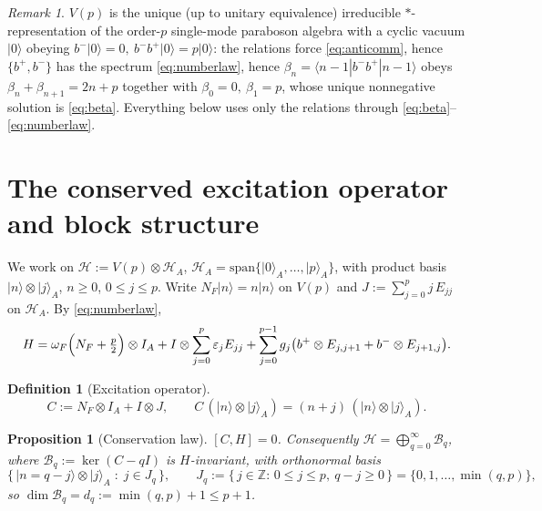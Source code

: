 \documentclass[12pt]{article}
\newtheorem{proposition}{Proposition}
\theoremstyle{definition}
\newtheorem{definition}{Definition}
\theoremstyle{remark}
\newtheorem{remark}{Remark}
\newcommand{\ket}[1]{\lvert #1\rangle}
\newcommand{\bp}{b^{+}}
\newcommand{\bm}{b^{-}}
\newcommand{\HA}{\mathcal{H}_A}
\begin{document}
\begin{remark}
$V(p)$ is the unique (up to unitary equivalence) irreducible $*$-representation of
the order-$p$ single-mode paraboson algebra with a cyclic vacuum $\ket0$ obeying
$\bm\ket0=0,\ \bm\bp\ket0=p\ket0$: the relations force \eqref{eq:anticomm}, hence
$\{\bp,\bm\}$ has the spectrum \eqref{eq:numberlaw}, hence
$\beta_n=\langle n-1|\bm\bp|n-1\rangle$ obeys $\beta_{n}+\beta_{n+1}=2n+p$ together
with $\beta_0=0,\ \beta_1=p$, whose unique nonnegative solution is \eqref{eq:beta}.
Everything below uses only the relations through \eqref{eq:beta}--\eqref{eq:numberlaw}.
\end{remark}

\section{The conserved excitation operator and block structure}

We work on $\mathcal{H}:=V(p)\otimes\HA$, $\HA=\mathrm{span}\{\ket0_A,\dots,\ket p_A\}$,
with product basis $\ket{n}\otimes\ket{j}_A$, $n\ge0$, $0\le j\le p$. Write
$N_F\ket n=n\ket n$ on $V(p)$ and $J:=\sum_{j=0}^{p} j\,E_{jj}$ on $\HA$.
By \eqref{eq:numberlaw},
\begin{equation}\label{eq:Hrewrite}
H=\omega_F\Bigl(N_F+\tfrac p2\Bigr)\otimes I_A
+I\otimes\sum_{j=0}^{p}\varepsilon_j E_{jj}
+\sum_{j=0}^{p-1} g_j\bigl(\bp\otimes E_{j,j+1}+\bm\otimes E_{j+1,j}\bigr).
\end{equation}

\begin{definition}[Excitation operator]
\[
C:=N_F\otimes I_A+I\otimes J,\qquad C\,(\ket n\otimes\ket j_A)=(n+j)\,(\ket n\otimes\ket j_A).
\]
\end{definition}

\begin{proposition}[Conservation law]\label{prop:conserved}
$[C,H]=0$. Consequently $\mathcal H=\bigoplus_{q=0}^{\infty}\mathcal B_q$, where
$\mathcal B_q:=\ker(C-qI)$ is $H$-invariant, with orthonormal basis
\begin{equation}\label{eq:blockbasis}
\bigl\{\,\ket{n=q-j}\otimes\ket{j}_A\;:\;j\in J_q\,\bigr\},\qquad
J_q:=\{\,j\in\mathbb Z:\,0\le j\le p,\ q-j\ge0\,\}=\{0,1,\dots,\min(q,p)\},
\end{equation}
so $\dim\mathcal B_q=d_q:=\min(q,p)+1\le p+1$.
\end{proposition}
\end{document}
